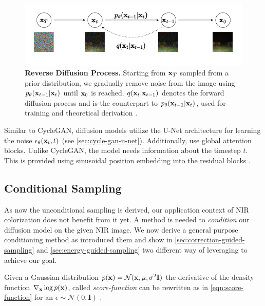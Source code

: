 \begin{figure}[htp!]
   \centering
   \includegraphics[width=.8\textwidth]{gfx/Unconditional-Sampling.pdf}
   \caption{
      \textbf{Reverse Diffusion Process.}
      Starting from $\mathbf{x}_T$ sampled from a prior distribution, we gradually remove noise from the image using $p_\theta(\mathbf{x}_{t-1}|\mathbf{x}_t)$ until $\mathbf{x}_0$ is reached.
      $q(\mathbf{x}_t | \mathbf{x}_{t-1})$ denotes the forward diffusion process and is the counterpart to $p_\theta(\mathbf{x}_{t-1}|\mathbf{x}_t)$, used for training and theoretical derivation \parencite{ddpm}.
   }
   \label{fig:reverse-diffusion-process}
\end{figure}



Similar to CycleGAN, diffusion models utilize the U-Net architecture for learning the noise $\epsilon_\theta(\mathbf{x}_t,t)$ \parencite{unet,mehri,ddpm,diffusion-beats-gans} (see \autoref{sec:cycle-gan-u-net}).
Additionally, \cite{diffusion-beats-gans} use global attention blocks.  
Unlike CycleGAN, the model needs information about the timestep $t$. This is provided using sinusoidal position embedding into the residual blocks \parencite{ddpm}.

\subsection{Conditional Sampling}
\label{sec:conditional-sampling}
As now the unconditional sampling is derived, our application context of NIR colorization does not benefit from it yet.
A method is needed to \textit{condition} our diffusion model on the given NIR image.
We now derive a general purpose conditioning method as \textcite{sbgm,diffusion-beats-gans} introduced them and show in \autoref{sec:correction-guided-sampling} and \autoref{sec:energy-guided-sampling}
two different way of leveraging to achieve our goal.

Given a Gaussian distribution $p(\mathbf{x}) = \mathcal{N}(\mathbf{x}, \mu, \sigma^2 \mathbf{I})$ the derivative of the density function $\nabla_{\mathbf{x}} \log p(\mathbf{x})$, called \textit{score-function} can be rewritten as in \autoref{eqn:score-function} for an $\epsilon \sim \mathcal{N}(0, \mathbf{I})$ \parencite{sbgm}.

